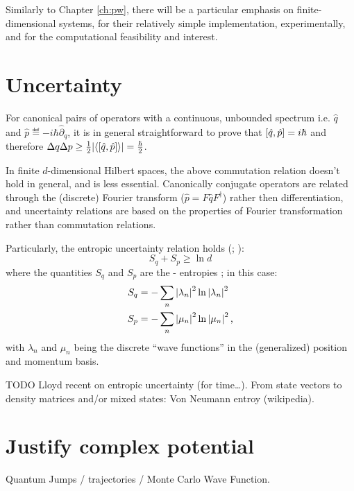 Similarly to Chapter \ref{ch:pw},
there will be a particular emphasis on finite-dimensional systems,
for their relatively simple implementation, experimentally,
and for the computational feasibility and interest.

\section{Uncertainty}

For canonical pairs of operators with a continuous, unbounded spectrum i.e.
$\hat{q}$ and $\hat{p} \eqdef -i\hbar\hat{\partial}_{q}$,
it is in general straightforward to prove that
$\qty[\hat{q}, \hat{p}] = i\hbar$ and therefore
$\Delta q \Delta p \geq {\frac{1}{2} \qty|\ev{\qty[\hat{q}, \hat{p}]}| = \frac{\hbar}{2}}$.

In finite $d$-dimensional Hilbert spaces, the above commutation relation doesn't hold
in general, and is less essential.
Canonically conjugate operators are related
through the (discrete) Fourier transform ($\hat{p} = F\hat{q}F^{\dagger}$)
rather then differentiation,
and uncertainty relations are based on
the properties of Fourier transformation
rather than commutation relations.

Particularly, the entropic uncertainty relation holds
(\cite[\S 2.4]{FiniteHilb}; \cite{Deutsch:Uncertainty}):
\begin{equation}
  S_q + S_p \geq \ln d
\end{equation}
where the quantities $S_q$ and $S_p$ are the - entropies
\parencite[\S {\it I}.A]{Wehner:Uncertainty}; in this case:
\begin{align}
  S_q &= -\sum_n \qty|\lambda_n |^2  \ln\qty|\lambda_n|^2 \\
  S_p &= -\sum_n \qty|\mu_n     |^2  \ln\qty|\mu_n    |^2
  \,\text{,}
\end{align}
with $\lambda_n$ and $\mu_n$ being the discrete ``wave functions'' in the
(generalized) position and momentum basis.

TODO Lloyd recent on entropic uncertainty (for time\dots).
From state vectors to density matrices and/or mixed states: Von Neumann entroy (wikipedia).

\section{Justify complex potential}

Quantum Jumps / trajectories / Monte Carlo Wave Function.

